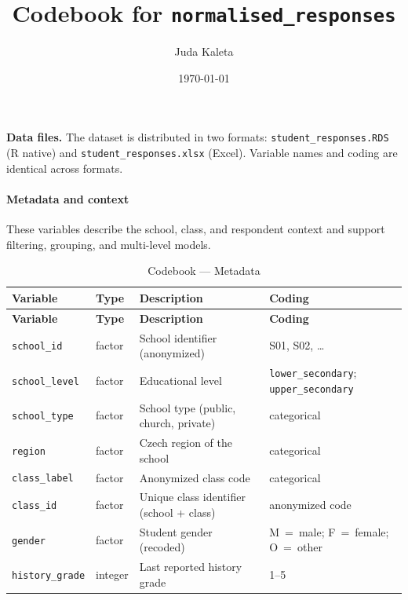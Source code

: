 \documentclass[11pt,a4paper]{article}
\title{Codebook for \texttt{normalised\_responses}}
\author{Juda Kaleta}
\date{\today}
\begin{document}
\maketitle

\textbf{Data files.} The dataset is distributed in two formats:
\texttt{student\_responses.RDS} (R native) and
\texttt{student\_responses.xlsx} (Excel).
Variable names and coding are identical across formats.

\smallskip

\paragraph{Metadata and context}
These variables describe the school, class, and respondent context and support filtering, grouping, and multi-level models.

{\small
\begin{longtable}{p{3cm} p{1.5cm} p{5.5cm} p{4cm}}
\caption{Codebook --- Metadata}\\
\toprule
\textbf{Variable} & \textbf{Type} & \textbf{Description} & \textbf{Coding}\\
\midrule
\endfirsthead
\toprule
\textbf{Variable} & \textbf{Type} & \textbf{Description} & \textbf{Coding}\\
\midrule
\endhead
\bottomrule
\endfoot

\texttt{school\_id}     & factor  & School identifier (anonymized) & S01, S02, \dots \\
\texttt{school\_level}  & factor  & Educational level & \texttt{lower\_secondary}; \texttt{upper\_secondary} \\
\texttt{school\_type}   & factor  & School type (public, church, private) & categorical \\
\texttt{region}         & factor  & Czech region of the school & categorical \\
\texttt{class\_label}   & factor  & Anonymized class code & categorical \\
\texttt{class\_id}      & factor  & Unique class identifier (school + class) & anonymized code \\
\texttt{gender}         & factor  & Student gender (recoded) & M~=~male; F~=~female; O~=~other \\
\texttt{history\_grade} & integer & Last reported history grade & 1--5 \\
\end{longtable}
}
\end{document}
